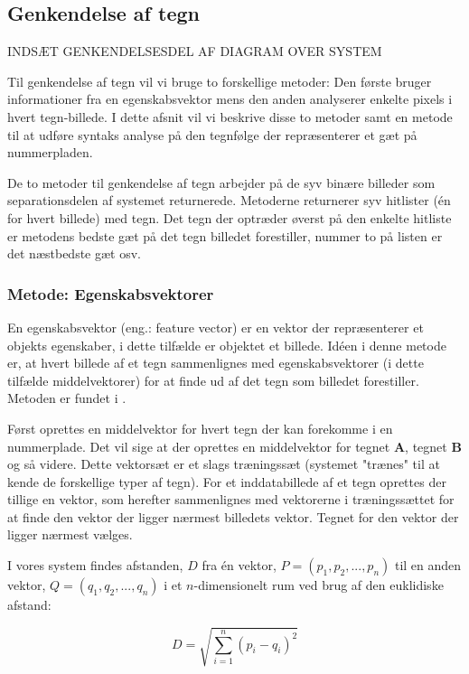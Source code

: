 \subsection{Genkendelse af tegn}

INDSÆT GENKENDELSESDEL AF DIAGRAM OVER SYSTEM
\label{sec_monster}

Til genkendelse af tegn vil vi bruge to forskellige metoder: Den første bruger informationer fra en egenskabsvektor mens den anden analyserer enkelte pixels i hvert tegn-billede. I dette afsnit vil vi beskrive disse to metoder samt en metode til at udføre syntaks analyse på den tegnfølge der repræsenterer et gæt på nummerpladen.

De to metoder til genkendelse af tegn arbejder på de syv binære billeder som separationsdelen af systemet returnerede. Metoderne returnerer syv hitlister (én for hvert billede) med tegn. Det tegn der optræder øverst på den enkelte hitliste er metodens bedste gæt på det tegn billedet forestiller, nummer to på listen er det næstbedste gæt osv.

\subsubsection{Metode: Egenskabsvektorer}
En egenskabsvektor (eng.: feature vector) er en vektor der repræsenterer et objekts egenskaber, i dette tilfælde er objektet et billede. Idéen i denne metode er, at hvert billede af et tegn sammenlignes med egenskabsvektorer (i dette tilfælde middelvektorer) for at finde ud af det tegn som billedet forestiller. Metoden er fundet i \cite{arth}.

Først oprettes en middelvektor for hvert tegn der kan forekomme i en nummerplade. Det vil sige at der oprettes en middelvektor for tegnet \textbf{A}, tegnet \textbf{B} og så videre. Dette vektorsæt er et slags træningssæt (systemet "trænes" til at kende de forskellige typer af tegn). For et inddatabillede af et tegn oprettes der tillige en vektor, som herefter sammenlignes med vektorerne i træningssættet for at finde den vektor der ligger nærmest billedets vektor. Tegnet for den vektor der ligger nærmest vælges. 

I vores system findes afstanden, $D$ fra én vektor, $P = (p_{1},p_{2},...,p_{n})$ til en anden vektor, $Q = (q_{1},q_{2},...,q_{n})$ i et $n$-dimensionelt rum ved brug af den euklidiske afstand\cite{wiki_euclid}:

\begin{displaymath}
	D = \sqrt{\sum_{i=1}^{n}(p_{i}-q_{i})^{2}}
\end{displaymath}

